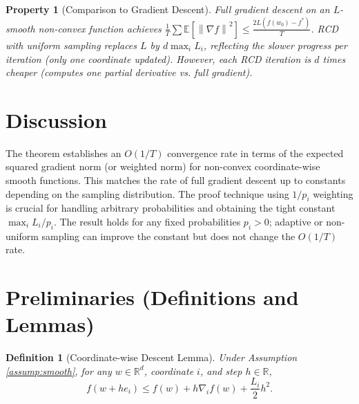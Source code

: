 \documentclass{article}
\newtheorem{definition}{Definition}
\newtheorem{property}{Property}
\newcommand{\R}{\mathbb{R}}
\newcommand{\E}{\mathbb{E}}
\newcommand{\norm}[1]{\left\|#1\right\|}
\begin{document}
\begin{property}[Comparison to Gradient Descent]
Full gradient descent on an $L$-smooth non-convex function achieves $\frac{1}{T}\sum \E[\norm{\nabla f}^2] \le \frac{2L(f(w_0)-f^*)}{T}$. RCD with uniform sampling replaces $L$ by $d \max_i L_i$, reflecting the slower progress per iteration (only one coordinate updated). However, each RCD iteration is $d$ times cheaper (computes one partial derivative vs. full gradient).
\end{property}

\section*{Discussion}

The theorem establishes an $O(1/T)$ convergence rate in terms of the expected squared gradient norm (or weighted norm) for non-convex coordinate-wise smooth functions. This matches the rate of full gradient descent up to constants depending on the sampling distribution. The proof technique using $1/p_i$ weighting is crucial for handling arbitrary probabilities and obtaining the tight constant $\max_i L_i/p_i$. The result holds for any fixed probabilities $p_i>0$; adaptive or non-uniform sampling can improve the constant but does not change the $O(1/T)$ rate.

\section*{Preliminaries (Definitions and Lemmas)}

\begin{definition}[Coordinate-wise Descent Lemma]
Under Assumption \ref{assump:smooth}, for any $w \in \R^d$, coordinate $i$, and step $h \in \R$,
\begin{equation}
f(w + h e_i) \le f(w) + h \nabla_i f(w) + \frac{L_i}{2} h^2.
\end{equation}
\end{definition}
\end{document}
